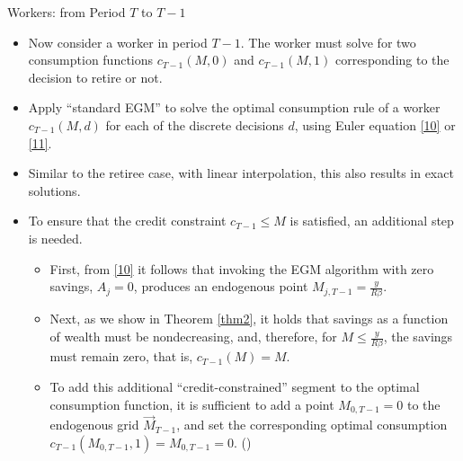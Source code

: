 \documentclass[aspectratio=169]{beamer}
\newcommand{\highlight}[1]{{\color{blue}{#1}}}
\begin{document}
\begin{frame}{Workers: from Period $T$ to $T-1$}
	\begin{itemize}\small
		
		\item Now consider a worker in period $T-1$. The worker must solve for two consumption functions $c_{T-1}(M, 0)$ and $c_{T-1}(M, 1)$ corresponding to the decision to retire or not.
		\item Apply ``standard EGM'' to solve the optimal consumption rule of a worker $c_{T-1}(M,d)$ for each of the discrete decisions $d$, using Euler equation \ref{10} or \ref{11}.
		\item Similar to the retiree case, with linear interpolation, this also results in exact solutions.
		\item To ensure that the credit constraint $c_{T-1} \leq M$ is satisfied, an additional step is needed. 
		\begin{itemize}
			\item First, from \ref{10} it follows that invoking the EGM algorithm with zero savings, $A_j=0$, produces an endogenous point $M_{j, T-1} = \frac{y}{R\beta}$. 
			\item Next, as we show in Theorem \ref{thm2}, it holds that savings as a function of wealth must be nondecreasing, and, therefore, for $M\leq \frac{y}{R\beta}$, the savings must remain zero, that is, $c_{T-1}(M) = M$.
			\item To add this additional ``credit-constrained'' segment to the optimal consumption function, it is sufficient to add a point $M_{0, T-1} = 0$ to the endogenous grid $\overrightarrow{M}_{T-1}$, and set the corresponding optimal consumption $c_{T-1}(M_{0, T-1}, 1) = M_{0, T-1}=0$. (\highlight{How Linear Interpolation Works?})
		\end{itemize}

	\end{itemize}
\end{frame}
\end{document}

